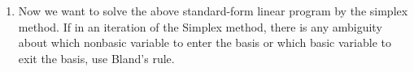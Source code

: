 \documentclass[11pt]{article}
\newcommand{\mb}[1]{\ensuremath{\boldsymbol{#1}}}
\begin{document}
\begin{enumerate}
Therefore, we have:
\begin{align*}
\mb{c} &= \begin{bmatrix} -1 \\ -2 \\ 0 \\ 0 \\ 0 \end{bmatrix}, \quad
\mb{A} = \begin{bmatrix} 
1 & -1 & 1 & 0 & 0 \\
-2 & 1 & 0 & 1 & 0 \\
2 & 1 & 0 & 0 & 1
\end{bmatrix}, \quad
\mb{b} = \begin{bmatrix} 1 \\ 1 \\ 5 \end{bmatrix}
\end{align*} 

\item Now we want to solve the above standard-form linear program by the simplex method. If in an iteration of the Simplex method, there is any ambiguity about which nonbasic variable to enter the basis or which basic variable to exit the basis, use Bland's rule. 


\begin{enumerate}
	

\end{enumerate}
\end{enumerate}
\end{document}

